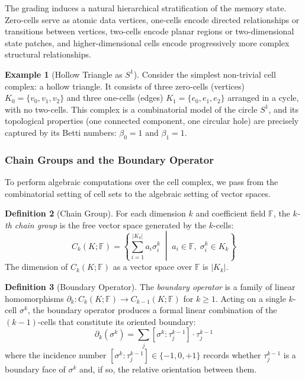 \documentclass[manuscript, nonacm, review=false]{acmart}
\theoremstyle{definition}
\newtheorem{definition}{Definition}[section]
\newtheorem{example}[definition]{Example}
\theoremstyle{plain}
\newcommand{\F}{\mathbb{F}}
\begin{document}
The grading induces a natural hierarchical stratification of the memory state. Zero-cells serve as atomic data vertices, one-cells encode directed relationships or transitions between vertices, two-cells encode planar regions or two-dimensional state patches, and higher-dimensional cells encode progressively more complex structural relationships.

\begin{example}[Hollow Triangle as $S^1$]
\label{ex:hollow_triangle}
Consider the simplest non-trivial cell complex: a hollow triangle. It consists of three zero-cells (vertices) $K_0 = \{v_0, v_1, v_2\}$ and three one-cells (edges) $K_1 = \{e_0, e_1, e_2\}$ arranged in a cycle, with no two-cells. This complex is a combinatorial model of the circle $S^1$, and its topological properties (one connected component, one circular hole) are precisely captured by its Betti numbers: $\beta_0 = 1$ and $\beta_1 = 1$.
\end{example}


\subsubsection{Chain Groups and the Boundary Operator}

To perform algebraic computations over the cell complex, we pass from the combinatorial setting of cell sets to the algebraic setting of vector spaces.

\begin{definition}[Chain Group]
\label{def:chain_group}
For each dimension $k$ and coefficient field $\F$, the \emph{$k$-th chain group} is the free vector space generated by the $k$-cells:
\begin{equation}
    C_k(K; \F) = \left\{ \sum_{i=1}^{|K_k|} a_i \sigma_i^k \;\middle|\; a_i \in \F,\; \sigma_i^k \in K_k \right\}
\end{equation}
The dimension of $C_k(K; \F)$ as a vector space over $\F$ is $|K_k|$.
\end{definition}

\begin{definition}[Boundary Operator]
\label{def:boundary}
The \emph{boundary operator} is a family of linear homomorphisms $\partial_k : C_k(K; \F) \to C_{k-1}(K; \F)$ for $k \geq 1$. Acting on a single $k$-cell $\sigma^k$, the boundary operator produces a formal linear combination of the $(k-1)$-cells that constitute its oriented boundary:
\begin{equation}
    \partial_k(\sigma^k) = \sum_{j} [\sigma^k : \tau_j^{k-1}] \cdot \tau_j^{k-1}
\end{equation}
where the incidence number $[\sigma^k : \tau_j^{k-1}] \in \{-1, 0, +1\}$ records whether $\tau_j^{k-1}$ is a boundary face of $\sigma^k$ and, if so, the relative orientation between them.
\end{definition}
\end{document}
